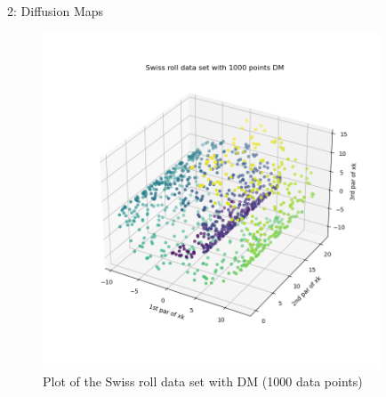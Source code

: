 \documentclass[10pt,a4paper]{article}
\begin{document}
\begin{task}{2: Diffusion Maps}
\begin{figure} [H]
    \centering
    \includegraphics[width=10cm]{images/Swiss_roll_1000_data_set.png}
    \caption{Plot of the Swiss roll data set with DM (1000 data points)}
    \label{fig:task2-2-13}
\end{figure}

\newpage 

\begin{figure} [H]
\centering
\end{figure}


\end{task}
\end{document}
